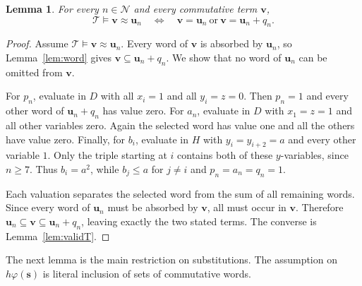 \documentclass[11pt,reqno]{amsart}
\newtheorem{lemma}[theorem]{Lemma}
\theoremstyle{remark}
\newcommand{\T}{\mathcal T}
\newcommand{\Ncal}{\mathcal N}
\newcommand{\bu}{\mathbf u}
\newcommand{\bv}{\mathbf v}
\newcommand{\bs}{\mathbf s}
\numberwithin{equation}{section}
\begin{document}
\begin{lemma}\label{lem:class}
For every $n\in\Ncal$ and every commutative term $\bv$,
\[
\T\models\bv\approx\bu_n
\quad\Longleftrightarrow\quad
\bv=\bu_n\ \text{or}\ \bv=\bu_n+q_n.
\]
\end{lemma}
\begin{proof}
Assume $\T\models\bv\approx\bu_n$. Every word of $\bv$ is absorbed
by $\bu_n$, so Lemma~\ref{lem:word} gives
$\bv\subseteq\bu_n+q_n$. We show that no word of $\bu_n$ can be
omitted from $\bv$.

For $p_n$, evaluate in $D$ with all $x_i=1$ and all $y_i=z=0$.
Then $p_n=1$ and every other word of $\bu_n+q_n$ has value zero.
For $a_n$, evaluate in $D$ with $x_1=z=1$ and all other variables zero.
Again the selected word has value one and all the others have value zero.
Finally, for $b_i$, evaluate in $H$ with $y_i=y_{i+2}=a$ and every other
variable $1$. Only the triple starting at $i$ contains both of these
$y$-variables, since $n\geq7$. Thus $b_i=a^2$, while $b_j\leq a$
for $j\ne i$ and $p_n=a_n=q_n=1$.

Each valuation separates the selected word from the sum of all remaining
words. Since every word of $\bu_n$ must be absorbed by $\bv$, all must
occur in $\bv$. Therefore
$\bu_n\subseteq\bv\subseteq\bu_n+q_n$, leaving exactly the two stated
terms. The converse is Lemma~\ref{lem:validT}.
\end{proof}

The next lemma is the main restriction on substitutions. The assumption
on $h\varphi(\bs)$ is literal inclusion of sets of commutative words.
\end{document}
